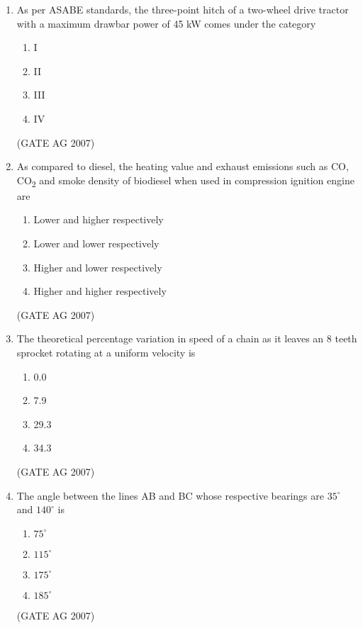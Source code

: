 \documentclass[journal,12pt,onecolumn]{IEEEtran}
\theoremstyle{remark}
\begin{document}
\begin{enumerate}
\item  As per ASABE standards, the three-point hitch of a two-wheel drive tractor with a maximum drawbar power of 45 kW comes under the category
\begin{multicols}{4}
\begin{enumerate}
    \item I
    \item II
    \item III
    \item IV
\end{enumerate}
\end{multicols}
\hfill(GATE AG 2007)


\item  As compared to diesel, the heating value and exhaust emissions such as CO, CO\textsubscript{2} and smoke density of biodiesel when used in compression ignition engine are
\begin{multicols}{4}
\begin{enumerate}
    \item Lower and higher respectively
    \item Lower and lower respectively
    \item Higher and lower respectively
    \item Higher and higher respectively
\end{enumerate}
\end{multicols}
\hfill(GATE AG 2007)

\item 
The theoretical percentage variation in speed of a chain as it leaves an 8 teeth sprocket rotating at  a uniform velocity is
\begin{multicols}{4}
\begin{enumerate}
    \item 0.0
    \item 7.9
    \item 29.3
    \item 34.3
\end{enumerate}
\end{multicols}
\hfill(GATE AG 2007)


\item  The angle between the lines AB and BC whose respective bearings are $35^\circ$ and $140^\circ$ is
\begin{multicols}{4}
\begin{enumerate}
    \item $75^\circ$
    \item $115^\circ$
    \item $175^\circ$
    \item $185^\circ$
\end{enumerate}
\end{multicols}
\hfill(GATE AG 2007)



\end{enumerate}
\end{document}
